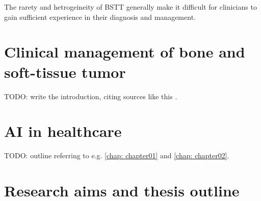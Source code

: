 The rarety and hetrogeineity of BSTT generally make it difficult for clinicians to gain sufficient experience in their diagnosis and management.



\section{Clinical management of bone and soft-tissue tumor}
TODO: write the introduction, citing sources like this \autocite{exampleKey2029}.



\section{AI in healthcare}
TODO: outline referring to e.g. \autoref{chap: chapter01} and \autoref{chap: chapter02}.




\section{Research aims and thesis outline}
